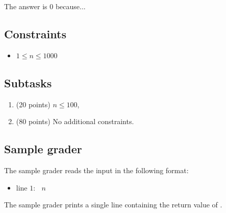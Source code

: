 \documentclass[12pt,a4paper]{article}
\begin{document}
The answer is $0$ because...

\subsection*{Constraints}

\begin{itemize}
    \item $1 \leq n \leq  1000$
\end{itemize}

\subsection*{Subtasks}

\begin{enumerate}
    \item (20 points) $n \leq 100$,
    \item (80 points) No additional constraints.
\end{enumerate}

\subsection*{Sample grader}

The sample grader reads the input in the following format:
\begin{itemize}
    \item line $1$:  $\;\;n$
\end{itemize}

The sample grader prints a single line containing the return value of .
\end{document}
